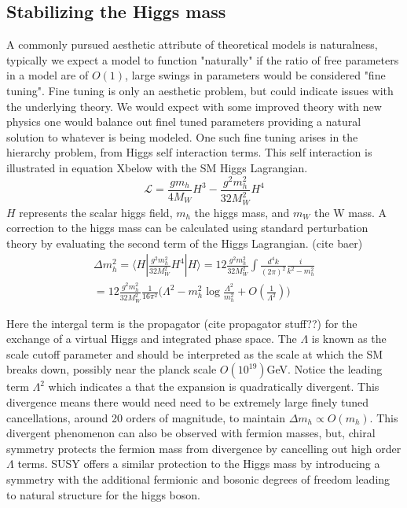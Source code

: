 \subsection{Stabilizing the Higgs mass}

A commonly pursued aesthetic attribute of theoretical models is naturalness, typically we expect a model to function "naturally" if the ratio of free parameters in a model are of $O(1)$, large swings in parameters would be considered "fine tuning". Fine tuning is only an aesthetic problem, but could indicate issues with the underlying theory. We would expect with some improved theory with new physics one would balance out finel tuned parameters providing a natural solution to whatever is being modeled. One such fine tuning arises in the hierarchy problem, from Higgs self interaction terms. This self interaction is illustrated in equation Xbelow with the SM Higgs Lagrangian.
\begin{equation}
\mathcal{L}=\frac{gm_h}{4M_W}H^3 - \frac{g^2m_h^2}{32M_W^2}H^4
\end{equation}
$H$ represents the scalar higgs field, $m_h$ the higgs mass, and $m_W$ the W mass. A correction to the higgs mass can be calculated using standard perturbation theory by evaluating the second term of the Higgs Lagrangian. (cite baer)
\begin{equation}
\begin{split}
\Delta m_h^2 = \langle H | \frac{g^2m_h^2}{32M_W^2} H^4 | H  \rangle = 12\frac{g^2m_h^2}{32M_W^2}\int \frac{d^4 k}{(2\pi)^2} \frac{i}{k^2 - m_h^2}\\
= 12\frac{g^2m_h^2}{32M_W^2} \frac{1}{16\pi^2}\big( \Lambda^2 - m_h^2\log\frac{\Lambda^2}{m_h^2} + O(\frac{1}{\Lambda^2})\big)
\end{split} 
\end{equation}
 
 Here the intergal term is the propagator (cite propagator stuff??) for the exchange of a virtual Higgs and integrated phase space. The $\Lambda$ is known as the scale cutoff parameter and should be interpreted as the scale at which the SM breaks down, possibly near the planck scale $O(10^{19})$GeV. Notice the leading term $\Lambda^2$ which indicates a that the expansion is quadratically divergent. This divergence means there would need need to be extremely large finely tuned cancellations, around 20 orders of magnitude, to maintain $\Delta m_h \propto O(m_h)$. This divergent phenomenon can also be observed with fermion masses, but, chiral symmetry protects the fermion mass from divergence by cancelling out high order $\Lambda$ terms. SUSY offers a similar protection to the Higgs mass by introducing a symmetry with the additional fermionic and bosonic degrees of freedom leading to natural structure for the higgs boson. 


